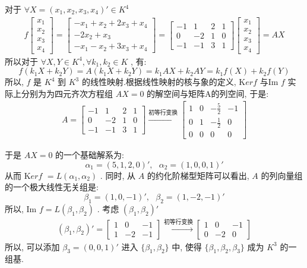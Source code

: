 \documentclass[11pt,a4paper,openany,oneside]{book}
\newcommand{\Ker}{\mathrm Ker}
\begin{document}
对于 $ \forall X = (x_1, x_2, x_3, x_4)' \in K^4 $ 
\begin{gather*}
f
\begin{bmatrix}
x_1 \\ x_2 \\ x_3 \\ x_4
\end{bmatrix}
=
\begin{bmatrix}
-x_1 + x_2 + 2x_3 + x_4 \\ 
-2x_2 + x_3 \\
-x_1 -x_2 + 3x_3 + x_4
\end{bmatrix}
=
\begin{bmatrix}
-1 & 1 & 2 & 1 \\
0  & -2 & 1 & 0 \\
-1 & -1 & 3 & 1 
\end{bmatrix}
\begin{bmatrix}
x_1 \\ x_2 \\ x_3 \\ x_4
\end{bmatrix}
=AX
\end{gather*}
所以对于 $ \forall X, Y \in K^4, \forall k_1,k_2 \in K $ , 有:
 $$  f(k_1X + k_2Y) = A(k_1X + k_2Y) = k_1AX + k_2AY = k_1f(X)+k_2f(Y)   $$ 
所以,  $ f $ 是 $ K^4 $ 到 $ K^3 $ 的线性映射.根据线性映射的核与象的定义, $\Ker f $ 与Im $ f $ 实际上分别为为四元齐次方程组 $ AX=0 $ 的解空间与矩阵A的列空间, 于是:
\begin{gather*}
A=
\begin{bmatrix}
-1 & 1 & 2 & 1 \\
0  & -2 & 1 & 0 \\
-1 & -1 & 3 & 1 
\end{bmatrix}
\xrightarrow{\text{初等行变换}}
\begin{bmatrix}
1 & 0 & -\frac{5}{2} & -1  \\
0 & 1 & -\frac{1}{2} &  0  \\
0 & 0 &         0      &  0
\end{bmatrix}
\end{gather*}

于是 $ AX=0 $ 的一个基础解系为:
 $$  \alpha_1 = ( 5,1 ,2,0)', \ \ \ \alpha_2 = (1, 0, 0, 1)'  $$ 
从而 $\Ker f$  $  = L(\alpha_1, \alpha_2) $ . 同时, 从 $ A $ 的约化阶梯型矩阵可以看出,  $ A $ 的列向量组的一个极大线性无关组是:
 $$  \beta_1 = (1, 0, -1)', \ \ \ \beta_2=(1, -2, -1)'  $$  
所以, Im $ f = L(\beta_1, \beta_2) $ . 考虑 $ (\beta_1, \beta_2)' $ 
\begin{gather*}
(\beta_1, \beta_2)'=
\begin{bmatrix}
1  &  0  &  -1  \\
1  &  -2  &  -1
\end{bmatrix}
\xrightarrow{初等行变换}
\begin{bmatrix}
1  &  0  &  -1  \\
0  &  -2 &  0  
\end{bmatrix}
\end{gather*}
所以, 可以添加 $ \beta_3=(0, 0, 1)' $ 进入 $ \{\beta_1, \beta_2\} $ 中, 使得 $ \{\beta_1, \beta_2, \beta_3 \} $ 成为 $ K^3 $ 的一组基.
\end{document}
